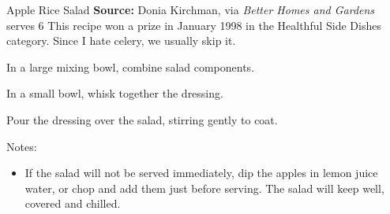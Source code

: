 \begin{recipe}[]{Apple Rice Salad}{}%
 {\textbf{Source:} Donia Kirchman, via \textit{Better Homes and Gardens} \hfill serves 6}
 \freeform This recipe won a prize in January 1998 in the Healthful Side Dishes category. Since I hate celery, we usually skip it.

 In a large mixing bowl, combine salad components.

 In a small bowl, whisk together the dressing.

 \newstep Pour the dressing over the salad, stirring gently to coat.

 \freeform Notes:
 \begin{itemize}
  \item If the salad will not be served immediately, dip the apples in lemon juice water, or chop and add them just before serving. The salad will keep well, covered and chilled.
 \end{itemize}

\end{recipe}

